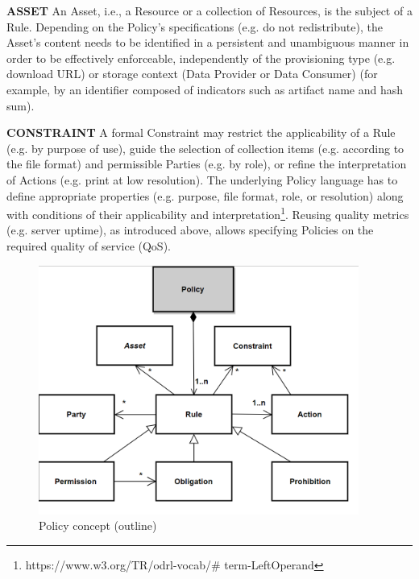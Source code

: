 \textbf{ASSET }An Asset, i.e., a Resource or a collection of Resources, is the subject of a Rule. Depending on the Policy’s specifications (e.g. do not redistribute), the Asset’s content needs to be identified in a persistent and unambiguous manner in order to be effectively enforceable, independently of the provisioning type (e.g. download URL) or storage context (Data Provider or Data Consumer) (for example, by an identifier composed of indicators such as artifact name and hash sum).

\textbf{CONSTRAINT} A formal Constraint may restrict the applicability of a Rule (e.g. by purpose of use), guide the selection of collection items (e.g. according to the file format) and permissible Parties (e.g. by role), or refine the interpretation of Actions (e.g. print at low resolution). The underlying Policy language has to define appropriate properties (e.g. purpose, file format, role, or resolution) along with conditions of their applicability and interpretation\footnote{https://www.w3.org/TR/odrl-vocab/$\#$ term-LeftOperand }. Reusing quality metrics (e.g. server uptime), as introduced above, allows specifying Policies on the required quality of service (QoS). 




\begin{figure}[H]
	\begin{Center}
		\includegraphics[width=4.14in,height=3.22in]{./media/image46.png}
		\caption{Policy concept (outline)}
		\label{fig:Policy_concept_outline}
	\end{Center}
\end{figure}





